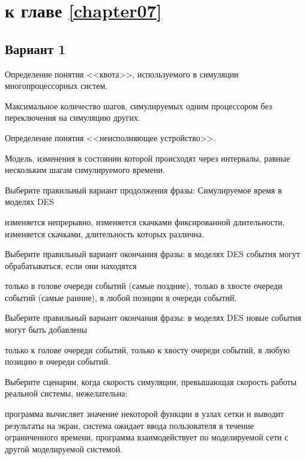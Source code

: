 \section{\Questions к главе \ref{chapter07}} %

\subsection*{Вариант 1}

\begin{questions}

\question[3] Определение понятия <<квота>>, используемого в симуляции многопроцессорных систем.
\begin{solution}[1cm]
Максимальное количество шагов, симулируемых одним процессором без переключения на симуляцию других.
\end{solution}

\question[3] Определение понятия <<неисполняющее устройство>>.
\begin{solution}[2cm]
Модель, изменения в состоянии которой происходят через интервалы, равные нескольким шагам симулируемого времени.
\end{solution}

\question[3] Выберите правильный вариант продолжения фразы: Симулируемое время в моделях DES 
\begin{choices}
    \choice изменяется непрерывно,
    \choice изменяется скачками фиксированной длительности,
    \correctchoice изменяется скачками, длительность которых различна.
\end{choices}
    
\question[3] Выберите правильный вариант окончания фразы: в моделях DES события могут обрабатываться, если они находятся
\begin{choices}
    \choice только в голове очереди событий (самые поздние),
    \correctchoice только в хвосте очереди событий (самые ранние),
    \choice в любой позиции в очереди событий.
\end{choices}

\question[3] Выберите правильный вариант окончания фразы: в моделях DES новые события могут быть добавлены
\begin{choices}
    \choice только к голове очереди событий,
    \choice только к хвосту очереди событий,
    \correctchoice в любую позицию в очереди событий.
\end{choices}
    
\question[3] Выберите сценарии, когда скорость симуляции, превышающая скорость работы реальной системы, нежелательна:
\begin{choices}
    \choice программа вычисляет значение некоторой функции в узлах сетки и выводит результаты на экран,
    \correctchoice система ожидает ввода пользователя в течение ограниченного времени,
    \choice программа взаимодействует по моделируемой сети с другой моделируемой системой.
\end{choices}



\end{questions}

